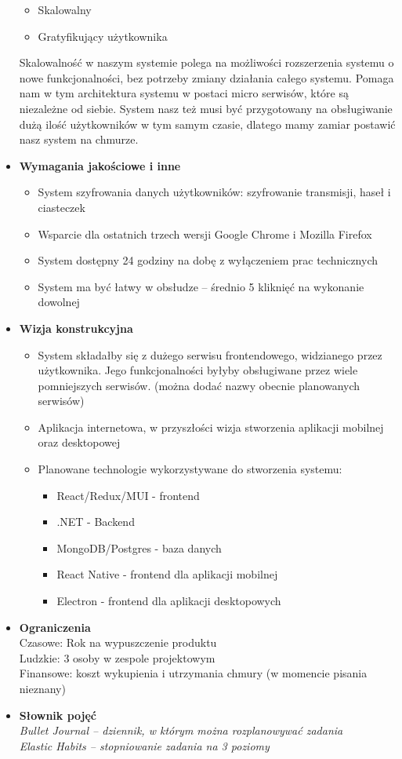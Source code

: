 \documentclass[a4paper,11pt]{report}
\begin{document}
\begin{itemize}
\begin{itemize}
		\item Skalowalny
		\item Gratyfikujący użytkownika
	\end{itemize}
	Skalowalność w naszym systemie polega na możliwości rozszerzenia systemu o nowe funkcjonalności, bez potrzeby zmiany działania całego systemu. Pomaga nam w tym architektura systemu w postaci micro serwisów, które są niezależne od siebie. System nasz też musi być przygotowany na obsługiwanie dużą ilość użytkowników w tym samym czasie, dlatego mamy zamiar postawić nasz system na chmurze. \\
	\item \textbf{Wymagania jakościowe i inne}
	\begin{itemize}
		\item System szyfrowania danych użytkowników: szyfrowanie transmisji, haseł i ciasteczek
		\item Wsparcie dla ostatnich trzech wersji Google Chrome i Mozilla Firefox
		\item System dostępny 24 godziny na dobę z wyłączeniem prac technicznych
		\item System ma być łatwy w obsłudze – średnio 5 kliknięć na wykonanie dowolnej 
	\end{itemize}
	\item \textbf{Wizja konstrukcyjna}
	\begin{itemize}
		\item System składałby się z dużego serwisu frontendowego, widzianego przez użytkownika. Jego funkcjonalności byłyby obsługiwane przez wiele pomniejszych serwisów. (można dodać nazwy obecnie planowanych serwisów) 
		\item Aplikacja internetowa, w przyszłości wizja stworzenia aplikacji mobilnej oraz desktopowej
		\item Planowane technologie wykorzystywane do stworzenia systemu:
		\begin{itemize}
			\item React/Redux/MUI - frontend
			\item .NET - Backend
			\item MongoDB/Postgres - baza danych
			\item React Native - frontend dla aplikacji mobilnej
			\item Electron - frontend dla aplikacji desktopowych
		\end{itemize}
	\end{itemize}
	\item \textbf{Ograniczenia}\\
Czasowe: Rok na wypuszczenie produktu\\
Ludzkie: 3 osoby w zespole projektowym\\
Finansowe: koszt wykupienia i utrzymania chmury (w momencie pisania nieznany)\\

	\item \textbf{Słownik pojęć}\\
	\emph{Bullet Journal – dziennik, w którym można rozplanowywać zadania}\\
	\emph{Elastic Habits – stopniowanie zadania na 3 poziomy}

\end{itemize}
\end{document}
